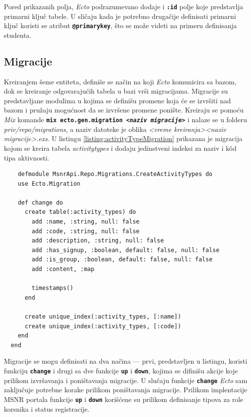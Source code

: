 \documentclass[12pt,oneside]{memoir}
\begin{document}
Pored prikazanih polja, \emph{Ecto} podrazumevano dodaje i \texttt{\textbf{:id}} polje
koje predstavlja primarni ključ tabele. U sličaju kada je potrebno drugačije definisati primarni ključ koristi
se atribut \texttt{\textbf{@primary{\textunderscore}key}}, što se može videti na primeru definisanja studenta.

\subsection{Migracije}
Kreiranjem šeme entiteta, definiše se način na koji \emph{Ecto} komunicira sa bazom, dok se kreiranje odgovarajućih
tabela u bazi vrši migracijama. Migracije su predstavljane modulima u kojima se definišu promene koja će se izvršiti nad
bazom i pružaju mogućnost da se izvršene promene ponište. Kreiraju se pomoću \emph{Mix} komande 
\texttt{\textbf{mix ecto.gen.migration \emph{<naziv migracije>}}} i nalaze se u folderu
\emph{priv/repo/migrations}, a naziv datoteke je oblika \emph{<vreme kreiranja>{\textunderscore}<naziv migracije>.exs}.
U listingu \ref{listing:activityTypeMigration} prikazana je migracija kojom se kreira tabela \emph{activity{\textunderscore}types} i
dodaju jedinstveni indeksi za naziv i k\^{o}d tipa aktivnosti.
\begin{listing}[!h]
  \begin{verbatim}
    defmodule MsnrApi.Repo.Migrations.CreateActivityTypes do
    use Ecto.Migration
  
    def change do
      create table(:activity_types) do
        add :name, :string, null: false
        add :code, :string, null: false
        add :description, :string, null: false
        add :has_signup, :boolean, default: false, null: false
        add :is_group, :boolean, default: false, null: false
        add :content, :map
  
        timestamps()
      end
  
      create unique_index(:activity_types, [:name])
      create unique_index(:activity_types, [:code])
    end
  end
\end{verbatim}
\caption{Migracija za kreiranje tabele \emph{activity{\textunderscore}types}}
\label{listing:activityTypeMigration}
\end{listing}

Migracije se mogu definisati na dva načina --- prvi, predstavljen u listingu, koristi funkciju \texttt{\textbf{change}}
i drugi sa dve funkcije \texttt{\textbf{up}} i \texttt{\textbf{down}}, kojima se difinišu akcije koje prilikom izvršavanja i
poništavanja migracije. U slučaju funkcije \texttt{\textbf{change}} \emph{Ecto} sam zaključuje potrebne korake prilikom
poništavanja migracije. Prilikom implentacije MSNR portala funkcije \texttt{\textbf{up}} i \texttt{\textbf{down}} korišćene
su prilikom definisanje tipova za role korsnika i status registracije. 
\end{document}
